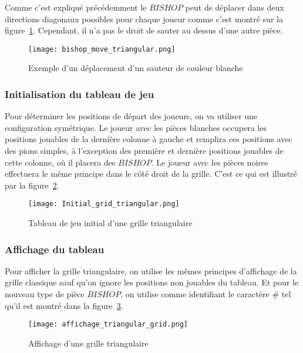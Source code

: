 \documentclass[11pt]{article}
\begin{document}
\begin{enumerate}
                        Comme c'est expliqué précédemment le $BISHOP$ peut de déplacer dans deux directions diagonaux possibles pour chaque joueur comme c'est montré sur la figure~\ref{figure27}. Cependant, il n'a pas le droit de sauter au dessus d'une autre pièce. \newpage
                        \begin{figure}[h]
                                \centering
                                \texttt{[image: bishop\_move\_triangular.png]}
                                \caption{ Exemple d'un déplacement d'un sauteur de couleur blanche }
                                \label{figure27}
                                \end{figure}
                \end{enumerate}
                
            \subsubsection{Initialisation du tableau de jeu}
                        Pour déterminer les positions de départ des joueurs, on va utiliser une configuration symétrique. Le joueur avec les pièces blanches occupera les positions jouables de la dernière colonne à gauche et remplira ces positions avec des pions simples, à l'exception des première et dernière positions jouables de cette colonne, où il placera des $BISHOP$. Le joueur avec les pièces noires effectuera le même principe dans le côté droit de la grille. C'est ce qui est illustré par la figure~\ref{figure28}.
                        \begin{figure}[h]
                                \centering
                                \texttt{[image: Initial\_grid\_triangular.png]}
                                \caption{ Tableau de jeu initial d'une grille triangulaire  }
                                \label{figure28}
                                \end{figure}
            \subsubsection{Affichage du tableau}
                Pour afficher la grille triangulaire, on utilise les mêmes principes d'affichage de la grille classique sauf qu'on ignore les positions non jouables du tableau. Et pour le nouveau type de pièce $BISHOP$, on utilise comme identifiant le caractère $\#$ tel qu'il est montré dans la figure~\ref{figure29}.
                \begin{figure}[h]
                                \centering
                                \texttt{[image: affichage\_triangular\_grid.png]}
                                \caption{ Affichage d'une grille triangulaire}
                                \label{figure29}
                                \end{figure}
\end{document}
